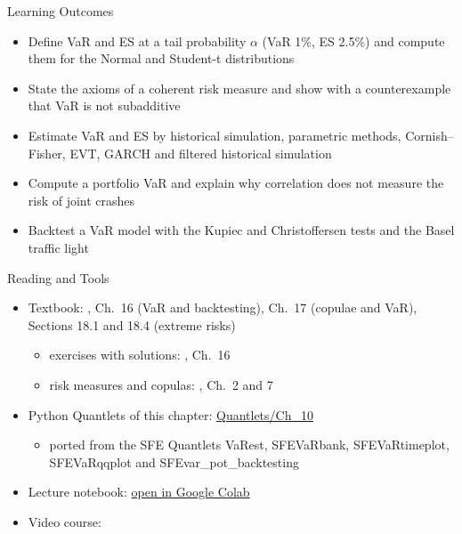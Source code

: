 \begin{frame}{Learning Outcomes}
\itemsize{\small}
\begin{itemize}
    \item Define VaR and ES at a tail probability $\alpha$ (VaR 1\%, ES 2.5\%) and compute them for the Normal and Student-t distributions
    \item State the axioms of a coherent risk measure and show with a counterexample that VaR is not subadditive
    \item Estimate VaR and ES by historical simulation, parametric methods, Cornish--Fisher, EVT, GARCH and filtered historical simulation
    \item Compute a portfolio VaR and explain why correlation does not measure the risk of joint crashes
    \item Backtest a VaR model with the Kupiec and Christoffersen tests and the Basel traffic light
\end{itemize}
\end{frame}

\begin{frame}{Reading and Tools}
\itemsize{\small}
\begin{itemize}
    \item Textbook: , Ch.~16 (VaR and backtesting), Ch.~17 (copulae and VaR), Sections 18.1 and 18.4 (extreme risks)
    \begin{itemize}
        \item exercises with solutions: , Ch.~16
        \item risk measures and copulas: , Ch.~2 and 7
    \end{itemize}
    \item Python Quantlets of this chapter: \href{https://github.com/danpele/SFM/tree/main/Quantlets/Ch_10}{Quantlets/Ch\_10}
    \begin{itemize}
        \item ported from the SFE Quantlets VaRest, SFEVaRbank, SFEVaRtimeplot, SFEVaRqqplot and SFEvar\_pot\_backtesting
    \end{itemize}
    \item Lecture notebook: \href{\colaburl{notebooks/EN/chapter10_lecture_notebook.ipynb}}{open in Google Colab}
    \item Video course: 
\end{itemize}
\end{frame}


